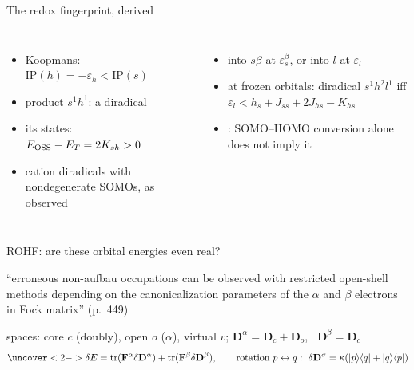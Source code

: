 \begin{frame}{The redox fingerprint, derived}
  \begin{columns}[T]
    \begin{itemize}
      \item Koopmans: $\mathrm{IP}(h)=-\varepsilon_h<\mathrm{IP}(s)$
      \item<2-> product $s^1h^1$: a diradical
      \item<3-> its states: $E_{\mathrm{OSS}}-E_T=2K_{sh}>0$
      \item<4->  cation diradicals with nondegenerate SOMOs, as observed
    \end{itemize}
    \begin{itemize}
      \item<5-> into $s\beta$ at $\varepsilon_s^\beta$, or into $l$ at $\varepsilon_l$
      \item<6-> at frozen orbitals: diradical $s^1h^2l^1$ iff $\varepsilon_l<h_s+J_{ss}+2J_{hs}-K_{hs}$
      \item<7-> : SOMO--HOMO conversion alone does not imply it
    \end{itemize}
  \end{columns}
\end{frame}

\begin{frame}{ROHF: are these orbital energies even real?}
  \begin{paperclaim}
    ``erroneous non-aufbau occupations can be observed with restricted open-shell methods depending on the
    canonicalization parameters of the $\alpha$ and $\beta$ electrons in Fock matrix'' (p.\ 449)
  \end{paperclaim}
  spaces: core $c$ (doubly), open $o$ ($\alpha$), virtual $v$; \quad $\mathbf D^\alpha=\mathbf D_c+\mathbf D_o$, \ $\mathbf D^\beta=\mathbf D_c$
  {\large
  \[
    \uncover<2->{\delta E=\operatorname{tr}(\mathbf F^\alpha\delta\mathbf D^\alpha)+\operatorname{tr}(\mathbf F^\beta\delta\mathbf D^\beta),\qquad
    \text{rotation }p\leftrightarrow q:\ \delta\mathbf D^\sigma=\kappa(\ket p\bra q+\ket q\bra p)}
  \]}
\end{frame}

